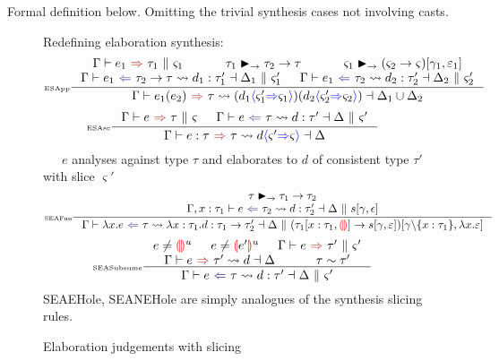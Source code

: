 \par Formal definition below. Omitting the trivial synthesis cases not involving casts.
\begin{figure}[H]
\small
Redefining elaboration synthesis:
\tiny
\[\inference[\tiny ESApp]{\synthesisSlice{e_1}{\tau_1}{\varsigma_1} & \tau_1 \funmatch \tau_2 \to \tau & \varsigma_1 \funmatch (\varsigma_2 \to \varsigma)[\gamma_1, \varepsilon_1]\\
\elaborationAnalysisSlice{e_1}{\tau_2 \to \tau}{d_1}{\tau_1'}{\Delta_1}{\varsigma_1'} & \elaborationAnalysisSlice{e_1}{\tau_2}{d_2}{\tau_2'}{\Delta_2}{\varsigma_2'}}{\elaborationSynthesis{e_1(e_2)}{\tau}{(d_1\scast{\varsigma_1'}{\varsigma_1})(d_2\scast{\varsigma_2'}{\varsigma_2})}{\Delta_1 \cup \Delta_2}}
\]
\[\inference[\tiny ESAsc]{\synthesisSlice{e}{\tau}{\varsigma} & \elaborationAnalysisSlice{e}{\tau}{d}{\tau'}{\Delta}{\varsigma'}}{\elaborationSynthesis{e:\tau}{\tau}{d\scast{\varsigma'}{\varsigma}}{\Delta}}\]
\small
{}\ \ \ $e$ analyses against type $\tau$ and elaborates to $d$ of consistent type $\tau'$ with slice $\varsigma'$
\tiny
\[
\inference[\tiny SEAFun]{\tau \funmatch \tau_1 \to \tau_2 \\ \elaborationAnalysisSlice[\Gamma,x:\tau_1]{e}{\tau_2}{d}{\tau_2'}{\Delta}{s[\gamma, \epsilon]}}{\elaborationAnalysisSlice{\lambda x. e}{\tau}{\lambda x:\tau_1. d}{\tau_1 \to \tau_2'}{\Delta}(\tau_1[x:\tau_1,\hole] \to s[\gamma, \varepsilon])[\gamma\backslash\{x:\tau_1\},\lambda x. \varepsilon]}
\]
\[
\inference[\tiny SEASubsume]{e \neq \hole^u & e \neq \hole[e']^u & \synthesisSlice{e}{\tau'}{\varsigma'}\\ \elaborationSynthesis{e}{\tau'}{d}{\Delta} & \tau \sim \tau'}{\elaborationAnalysisSlice{e}{\tau}{d}{\tau'}{\Delta}{\varsigma'}}
\]
\center
SEAEHole, SEANEHole are simply analogues of the synthesis slicing rules.
\caption{Elaboration judgements with slicing}
\label{fig:elaborationsliced}
\end{figure}

